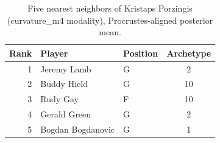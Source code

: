 \begin{table}[htbp]
  \centering\small
  \begin{tabular}{rllc}
    \toprule
    Rank & Player & Position & Archetype \\
    \midrule
    1 & Jeremy Lamb & G & 2 \\
    2 & Buddy Hield & G & 10 \\
    3 & Rudy Gay & F & 10 \\
    4 & Gerald Green & G & 2 \\
    5 & Bogdan Bogdanovic & G & 1 \\
    \bottomrule
  \end{tabular}
  \caption{Five nearest neighbors of Kristaps Porzingis (curvature_m4 modality), Procrustes-aligned posterior mean.}
  \label{tab:Kristaps_Porzingis_neighbors_curvature_m4}
\end{table}


